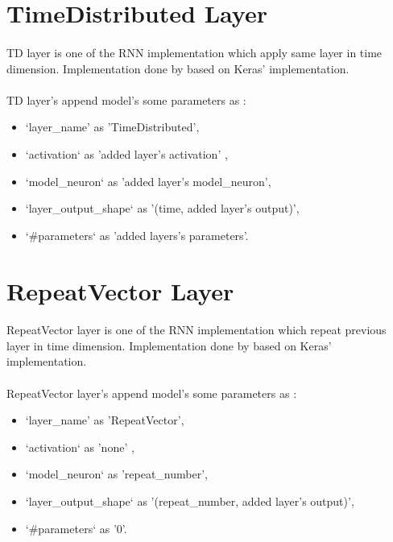 \documentclass[12pt]{report}
\begin{document}
\section{TimeDistributed Layer}

\paragraph{}
TD layer is one of the RNN implementation which apply same layer in time dimension. Implementation done by \cite{MGK} based on Keras' \cite{Keras} implementation. 

\paragraph{}
TD layer's append model's some parameters as :
\begin{itemize}
	\item `layer\_name' as 'TimeDistributed',
	\item `activation` as 'added layer's activation' ,
	\item `model\_neuron` as 'added layer's model\_neuron',
	\item `layer\_output\_shape` as '(time, added layer's output)',
	\item `\#parameters` as 'added layers's parameters'.
\end{itemize}



\section{RepeatVector Layer}

\paragraph{}
RepeatVector layer is one of the RNN implementation which repeat previous layer in time dimension. Implementation done by \cite{MGK} based on Keras' \cite{Keras} implementation. 

\paragraph{}
RepeatVector layer's append model's some parameters as :
\begin{itemize}
	\item `layer\_name' as 'RepeatVector',
	\item `activation` as 'none' ,
	\item `model\_neuron` as 'repeat\_number',
	\item `layer\_output\_shape` as '(repeat\_number, added layer's output)',
	\item `\#parameters` as '0'.
\end{itemize}
\end{document}
